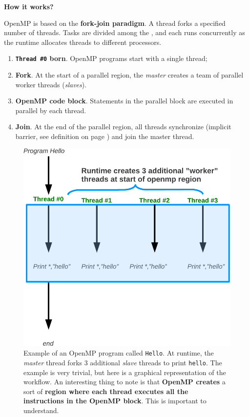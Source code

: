 \begin{flushleft}
    \textcolor{Green3}{ \textbf{How it works?}}
\end{flushleft}
OpenMP is based on the \textbf{fork-join paradigm}. A  thread forks a specified number of  threads. Tasks are divided among the , and each  runs concurrently as the runtime allocates threads to different processors.
\begin{enumerate}
    \item \textbf{\texttt{Thread \#0} born}. OpenMP programs start with a single thread;
    \item \textbf{Fork}. At the start of a parallel region, the \emph{master} creates a team of parallel worker threads (\emph{slaves}).
    \item \textbf{OpenMP code block}. Statements in the parallel block are executed in parallel by each thread.
    \item \textbf{Join}. At the end of the parallel region, all threads synchronize (implicit barrier, see definition on page \pageref{paragraph: Joining through Barriers}) and join the master thread.\cite{whatIsOpenMPumassJohnstonHans}
\end{enumerate}

\newpage

\begin{figure}[!htp]
    \centering
    \includegraphics[width=.7\textwidth]{img/openmp-1.pdf}
    \caption{Example of an OpenMP program called \texttt{Hello}. At runtime, the \emph{master} thread forks 3 additional \emph{slave} threads to print \texttt{hello}. The example is very trivial, but here is a graphical representation of the workflow. An interesting thing to note is that \textbf{OpenMP creates} a sort of \textbf{region where each thread executes all the instructions in the OpenMP block}. This is important to understand.\cite{whatIsOpenMPumassJohnstonHans}}
    \label{fig: how OpenMP works}
\end{figure}